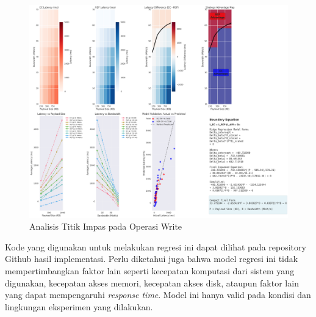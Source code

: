 \begin{enumerate}
  \begin{figure}[ht]
    \centering
    \includegraphics[width=\textwidth]{resources/chapter-4/write_bigload_avgnet_boundary.png}

    \caption{Analisis Titik Impas pada Operasi Write}
    \label{fig:write-bigload-avgnet-boundary}
  \end{figure}

  Kode yang digunakan untuk melakukan regresi ini dapat dilihat pada repository Github hasil implementasi. Perlu diketahui juga bahwa model regresi ini tidak mempertimbangkan faktor lain seperti kecepatan komputasi dari sistem yang digunakan, kecepatan akses memori, kecepatan akses disk, ataupun faktor lain yang dapat mempengaruhi \textit{response time}. Model ini hanya valid pada kondisi dan lingkungan eksperimen yang dilakukan.

\end{enumerate}